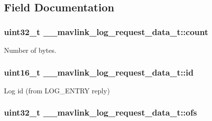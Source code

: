 \subsection{Field Documentation}
\hypertarget{struct____mavlink__log__request__data__t_addf7b7d415e01b0d04bfd774703b1e67}{
\subsubsection[{count}]{\setlength{\rightskip}{0pt plus 5cm}uint32\+\_\+t \+\_\+\+\_\+mavlink\+\_\+log\+\_\+request\+\_\+data\+\_\+t\+::count}}\label{struct____mavlink__log__request__data__t_addf7b7d415e01b0d04bfd774703b1e67}


Number of bytes. 

\hypertarget{struct____mavlink__log__request__data__t_a097a2a1603080846c44d0f6d8addd365}{
\subsubsection[{id}]{\setlength{\rightskip}{0pt plus 5cm}uint16\+\_\+t \+\_\+\+\_\+mavlink\+\_\+log\+\_\+request\+\_\+data\+\_\+t\+::id}}\label{struct____mavlink__log__request__data__t_a097a2a1603080846c44d0f6d8addd365}


Log id (from L\+O\+G\+\_\+\+E\+N\+T\+R\+Y reply) 

\hypertarget{struct____mavlink__log__request__data__t_a05e11a328deb8bf97856e613f23ad732}{
\subsubsection[{ofs}]{\setlength{\rightskip}{0pt plus 5cm}uint32\+\_\+t \+\_\+\+\_\+mavlink\+\_\+log\+\_\+request\+\_\+data\+\_\+t\+::ofs}}\label{struct____mavlink__log__request__data__t_a05e11a328deb8bf97856e613f23ad732}


